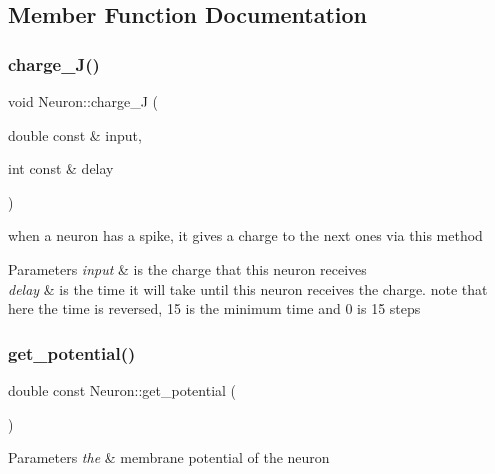 \subsection{Member Function Documentation}
\mbox{\label{class_neuron_abfc4d63f88dd429dbd0d9dd379e232a0}} 
\subsubsection{\texorpdfstring{charge\+\_\+\+J()}{charge\_J()}}
{\footnotesize\ttfamily void Neuron\+::charge\+\_\+J (\begin{DoxyParamCaption}\item[{double const \&}]{input,  }\item[{int const \&}]{delay }\end{DoxyParamCaption})}

when a neuron has a spike, it gives a charge to the next ones via this method 
\begin{DoxyParams}{Parameters}
{\em input} & is the charge that this neuron receives \\
\hline
{\em delay} & is the time it will take until this neuron receives the charge. note that here the time is reversed, 15 is the minimum time and 0 is 15 steps \\
\hline
\end{DoxyParams}
\mbox{\label{class_neuron_a96dcaec2f9146dedd3f926d35b2c08f4}} 
\subsubsection{\texorpdfstring{get\+\_\+potential()}{get\_potential()}}
{\footnotesize\ttfamily double const Neuron\+::get\+\_\+potential (\begin{DoxyParamCaption}{ }\end{DoxyParamCaption})}


\begin{DoxyParams}{Parameters}
{\em the} & membrane potential of the neuron \\
\hline
\end{DoxyParams}
\mbox{\label{class_neuron_a689b33332f090aab40360f53c8bcfac6}} 
